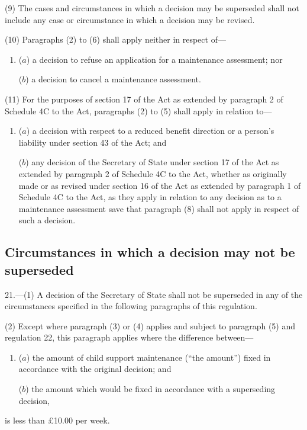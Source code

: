 \documentclass[a4paper,12pt]{article}
\begin{document}
(9) The cases and circumstances in which a decision may be superseded shall not include any case or circumstance in which a decision may be revised.

(10) Paragraphs (2) to (6) shall apply neither in respect of---
\begin{enumerate}\item[]
($a$) a decision to refuse an application for a maintenance assessment; nor

($b$) a decision to cancel a maintenance assessment.
\end{enumerate}

(11) For the purposes of section 17 of the Act as extended by paragraph 2 of Schedule 4C to the Act, paragraphs (2) to (5) shall apply in relation to---
\begin{enumerate}\item[]
($a$) a decision with respect to a reduced benefit direction or a person’s liability under section 43 of the Act; and

($b$) any decision of the Secretary of State under section 17 of the Act as extended by paragraph 2 of Schedule 4C to the Act, whether as originally made or as revised under section 16 of the Act as extended by paragraph 1 of Schedule 4C to the Act, as they apply in relation to any decision as to a maintenance assessment save that paragraph (8) shall not apply in respect of such a decision.
\end{enumerate}


\subsection[21. Circumstances in which a decision may not be superseded]{Circumstances in which a decision may not be superseded}

21.—(1) A decision of the Secretary of State shall not be superseded in any of the circumstances specified in the following paragraphs of this regulation.

(2) Except where paragraph (3) or (4) applies and subject to paragraph (5) and regulation 22, this paragraph applies where the difference between---
\begin{enumerate}\item[]
\begin{sloppypar}
($a$) the amount of child support maintenance (“the amount”) fixed in accordance with the original decision; and
\end{sloppypar}

($b$) the amount which would be fixed in accordance with a superseding decision,
\end{enumerate}
is less than £10$.$00 per week.
\end{document}
